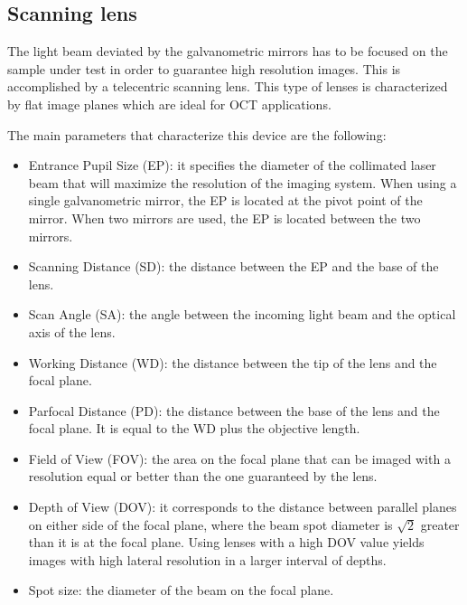 \subsection{Scanning lens}
The light beam deviated by the galvanometric mirrors has to be focused on the sample under test in order to guarantee high resolution images. This is accomplished by a telecentric scanning lens. This type of lenses is characterized by flat image planes which are ideal for OCT applications. 

The main parameters that characterize this device are the following:
\begin{itemize}
	\item Entrance Pupil Size (EP): it specifies the diameter of the collimated laser beam that will maximize the resolution of the imaging system. When using a single galvanometric mirror, the EP is located at the pivot point of the mirror. When two mirrors are used, the EP is located between the two mirrors. 

	\item Scanning Distance (SD): the distance between the EP and the base of the lens. 
	
	\item Scan Angle (SA): the angle between the incoming light beam and the optical axis of the lens. 
	
	\item Working Distance (WD): the distance between the tip of the lens and the focal plane.
	
	\item Parfocal Distance (PD): the distance between the base of the lens and the focal plane. It is equal to the WD plus the objective length.
	
	\item Field of View (FOV): the area on the focal plane that can be imaged with a resolution equal or better than the one guaranteed by the lens. 
	
	\item Depth of View (DOV): it corresponds to the distance between parallel planes on either side of the focal plane, where the beam spot diameter is $\sqrt{2}$ greater than it is at the focal plane. Using lenses with a high DOV value yields images with high lateral resolution in a larger interval of depths. 
	
	\item Spot size: the diameter of the beam on the focal plane. 
\end{itemize}



